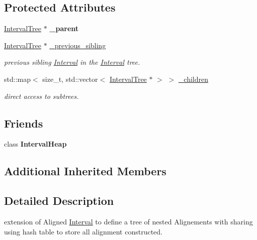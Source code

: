 \subsection*{Protected Attributes}
\begin{DoxyCompactItemize}
\item 
\mbox{\label{classIntervalTree_a88e4c8c1ec09527a477646747e482fe4}} 
\mbox{\hyperlink{classIntervalTree}{Interval\+Tree}} $\ast$ {\bfseries \+\_\+parent}
\item 
\mbox{\hyperlink{classIntervalTree}{Interval\+Tree}} $\ast$ \mbox{\hyperlink{classIntervalTree_a36b39cfc069e75085d3471b73e7c0d8d}{\+\_\+previous\+\_\+sibling}}
\begin{DoxyCompactList}\small\item\em previous sibling \mbox{\hyperlink{classInterval}{Interval}} in the \mbox{\hyperlink{classInterval}{Interval}} tree. \end{DoxyCompactList}\item 
std\+::map$<$ size\+\_\+t, std\+::vector$<$ \mbox{\hyperlink{classIntervalTree}{Interval\+Tree}} $\ast$ $>$ $>$ \mbox{\hyperlink{classIntervalTree_ab33b66f644ed154e05a69c13e979f1cd}{\+\_\+children}}
\begin{DoxyCompactList}\small\item\em direct access to subtrees. \end{DoxyCompactList}\end{DoxyCompactItemize}
\subsection*{Friends}
\begin{DoxyCompactItemize}
\item 
\mbox{\label{classIntervalTree_ac157527bf2349e36ef2475096d268e4e}} 
class {\bfseries Interval\+Heap}
\end{DoxyCompactItemize}
\subsection*{Additional Inherited Members}


\subsection{Detailed Description}
extension of Aligned \mbox{\hyperlink{classInterval}{Interval}} to define a tree of nested Alignements with sharing using hash table to store all alignment constructed. 

